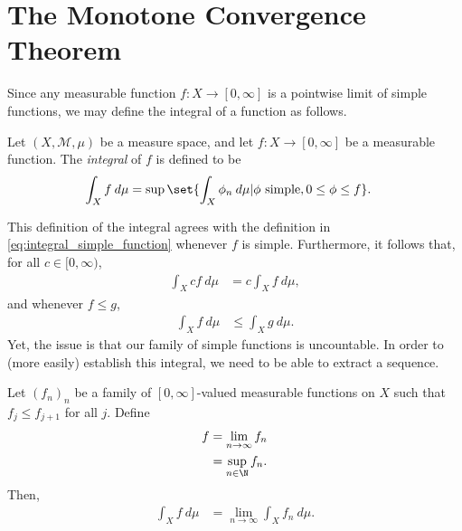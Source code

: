 \documentclass[12pt]{mypackage}
\begin{document}
\section{The Monotone Convergence Theorem}%
Since any measurable function $f\colon X\rightarrow [0,\infty]$ is a pointwise limit of simple functions, we may define the integral of a function as follows.
\begin{definition}
  Let $\left( X,\mathcal{M},\mu \right)$ be a measure space, and let $f\colon X\rightarrow [0,\infty]$ be a measurable function. The \textit{integral} of $f$ is defined to be
  \begin{align*}
    \int_{X}^{} f\:d\mu &= \sup\set{ \int_{X}^{} \phi_n\:d\mu | \phi\text{ simple},0\leq \phi \leq f}.
  \end{align*}
\end{definition}
This definition of the integral agrees with the definition in \eqref{eq:integral_simple_function} whenever $f$ is simple. Furthermore, it follows that, for all $c\in [0,\infty)$,
\begin{align*}
  \int_{X}^{} cf\:d\mu &= c \int_{X}^{} f\:d\mu,
\end{align*}
and whenever $f\leq g$,
\begin{align*}
  \int_{X}^{} f\:d\mu &\leq \int_{X}^{} g\:d\mu.
\end{align*}
Yet, the issue is that our family of simple functions is uncountable. In order to (more easily) establish this integral, we need to be able to extract a sequence.
\begin{theorem}
  Let $\left( f_n \right)_n$ be a family of $[0,\infty]$-valued measurable functions on $X$ such that $f_j\leq f_{j+1}$ for all $j$. Define 
  \begin{align*}
    f &= \lim_{n\rightarrow\infty}f_n\\
      &= \sup_{n\in \N} f_n.
  \end{align*}
  Then,
  \begin{align*}
    \int_{X}^{} f\:d\mu &= \lim_{n\rightarrow\infty} \int_{X}^{} f_n\:d\mu.
  \end{align*}
\end{theorem}
\end{document}
